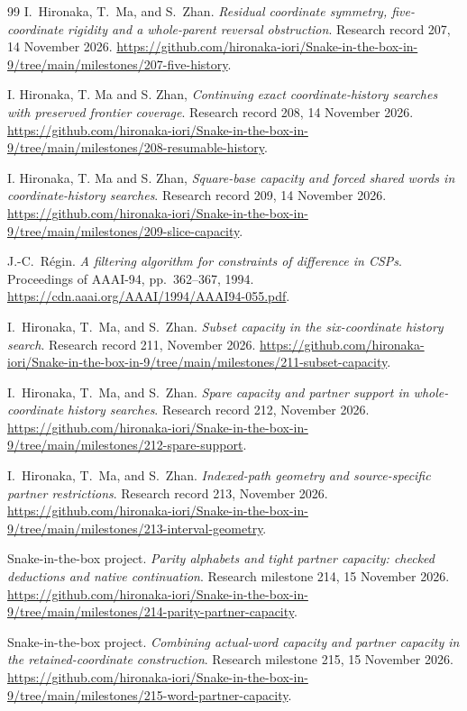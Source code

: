 \documentclass[11pt,a4paper]{article}
\theoremstyle{definition}
\theoremstyle{remark}
\begin{document}
\begin{thebibliography}{99}
I.~Hironaka, T.~Ma, and S.~Zhan. \emph{Residual coordinate symmetry,
five-coordinate rigidity and a whole-parent reversal obstruction}.
Research record 207, 14 November 2026.
\url{https://github.com/hironaka-iori/Snake-in-the-box-in-9/tree/main/milestones/207-five-history}.

I. Hironaka, T. Ma and S. Zhan, \emph{Continuing exact coordinate-history
searches with preserved frontier coverage}. Research record 208,
14 November 2026.
\url{https://github.com/hironaka-iori/Snake-in-the-box-in-9/tree/main/milestones/208-resumable-history}.

I. Hironaka, T. Ma and S. Zhan, \emph{Square-base capacity and forced
shared words in coordinate-history searches}. Research record 209,
14 November 2026.
\url{https://github.com/hironaka-iori/Snake-in-the-box-in-9/tree/main/milestones/209-slice-capacity}.

J.-C.~R\'egin. \emph{A filtering algorithm for constraints of difference
in CSPs}. Proceedings of AAAI-94, pp.~362--367, 1994.
\url{https://cdn.aaai.org/AAAI/1994/AAAI94-055.pdf}.

I.~Hironaka, T.~Ma, and S.~Zhan. \emph{Subset capacity in the
six-coordinate history search}. Research record 211, November 2026.
\url{https://github.com/hironaka-iori/Snake-in-the-box-in-9/tree/main/milestones/211-subset-capacity}.

I.~Hironaka, T.~Ma, and S.~Zhan. \emph{Spare capacity and partner support
in whole-coordinate history searches}. Research record 212, November 2026.
\url{https://github.com/hironaka-iori/Snake-in-the-box-in-9/tree/main/milestones/212-spare-support}.

I.~Hironaka, T.~Ma, and S.~Zhan. \emph{Indexed-path geometry and
source-specific partner restrictions}. Research record 213, November 2026.
\url{https://github.com/hironaka-iori/Snake-in-the-box-in-9/tree/main/milestones/213-interval-geometry}.


Snake-in-the-box project. \emph{Parity alphabets and tight partner
capacity: checked deductions and native continuation}. Research
milestone 214, 15 November 2026.
\url{https://github.com/hironaka-iori/Snake-in-the-box-in-9/tree/main/milestones/214-parity-partner-capacity}.


Snake-in-the-box project. \emph{Combining actual-word capacity and partner
capacity in the retained-coordinate construction}. Research milestone
215, 15 November 2026.
\url{https://github.com/hironaka-iori/Snake-in-the-box-in-9/tree/main/milestones/215-word-partner-capacity}.



\end{thebibliography}
\end{document}
